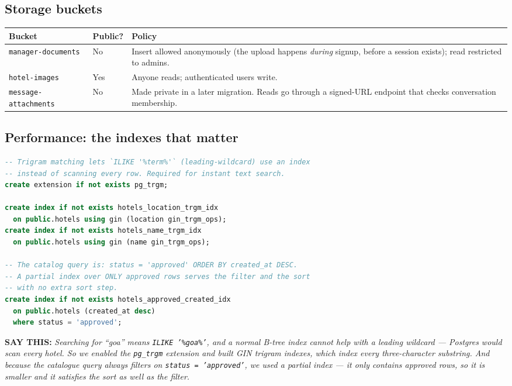 \documentclass[11pt,a4paper]{article}
\newcommand{\saythis}[1]{\begin{saybox}\textbf{\small\color{primary}SAY THIS:} \textit{#1}\end{saybox}}
\begin{document}
\subsection{Storage buckets}

\begin{longtable}{@{}p{4.2cm}p{2.0cm}p{8.6cm}@{}}
\toprule
\textbf{Bucket} & \textbf{Public?} & \textbf{Policy} \\
\midrule
\endhead
\texttt{manager-documents} & No & Insert allowed anonymously (the upload happens
\emph{during} signup, before a session exists); read restricted to admins. \\
\addlinespace
\texttt{hotel-images} & Yes & Anyone reads; authenticated users write. \\
\addlinespace
\texttt{message-attachments} & No & Made private in a later migration. Reads go
through a signed-URL endpoint that checks conversation membership. \\
\bottomrule
\end{longtable}

\subsection{Performance: the indexes that matter}

\begin{lstlisting}[language=SQL,caption={supabase/perf\_migration.sql}]
-- Trigram matching lets `ILIKE '%term%'` (leading-wildcard) use an index
-- instead of scanning every row. Required for instant text search.
create extension if not exists pg_trgm;

create index if not exists hotels_location_trgm_idx
  on public.hotels using gin (location gin_trgm_ops);
create index if not exists hotels_name_trgm_idx
  on public.hotels using gin (name gin_trgm_ops);

-- The catalog query is: status = 'approved' ORDER BY created_at DESC.
-- A partial index over ONLY approved rows serves the filter and the sort
-- with no extra sort step.
create index if not exists hotels_approved_created_idx
  on public.hotels (created_at desc)
  where status = 'approved';
\end{lstlisting}

\saythis{Searching for ``goa'' means \texttt{ILIKE '\%goa\%'}, and a normal B-tree
index cannot help with a leading wildcard --- Postgres would scan every hotel. So
we enabled the \texttt{pg\_trgm} extension and built GIN trigram indexes, which
index every three-character substring. And because the catalogue query always
filters on \texttt{status = 'approved'}, we used a \emph{partial} index --- it only
contains approved rows, so it is smaller and it satisfies the sort as well as the
filter.}
\end{document}
